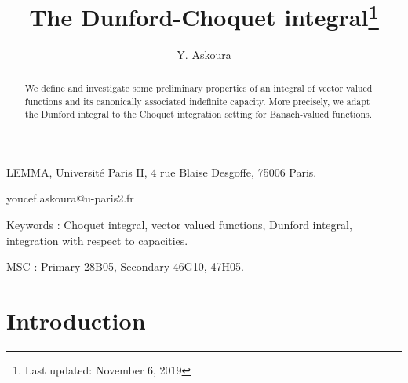 \documentclass[preprint,authoryear,12pt]{article}%
\theoremstyle{definition}
\begin{document}

\title{The Dunford-Choquet integral\footnote{Last updated: November 6, 2019}}
\author{Y. Askoura}

\maketitle

{LEMMA, Universit\'e Paris II, 
4 rue Blaise Desgoffe, 75006 Paris.}

{youcef.askoura@u-paris2.fr}

\begin{abstract} We define and investigate some preliminary properties of an integral of vector valued functions and its canonically associated indefinite capacity. More precisely, we adapt the Dunford integral to the Choquet integration setting for Banach-valued functions. 
\end{abstract}

Keywords :  Choquet integral, vector valued functions,  Dunford integral, integration with respect to capacities.


MSC : Primary 28B05, Secondary 46G10, 47H05.


\section{Introduction}
\end{document}
